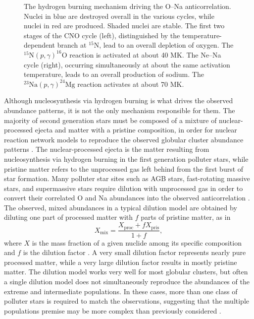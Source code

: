 \begin{figure}[t]
\begin{minipage}{.44\linewidth}
\begin{tikzpicture}[scale=1.5, every node/.style={transform shape}]
\end{tikzpicture}
\end{minipage}
\vspace{0.75 cm}
\caption{\label{fig:CNO_NeNa}The hydrogen burning mechanism driving the O--Na anticorrelation. Nuclei in blue are destroyed overall in the various cycles, while nuclei in red are produced. Shaded nuclei are stable. The first two stages of the CNO cycle (left), distinguished by the temperature-dependent branch at $^{15}$N, lead to an overall depletion of oxygen. The $^{15}\mathrm{N}(p, \gamma)^{16}\mathrm{O}$ reaction is activated at about 40 MK. The Ne--Na cycle (right), occurring simultaneously at about the same activation temperature, leads to an overall production of sodium. The $^{23}\mathrm{Na}(p,\gamma)^{24}\mathrm{Mg}$ reaction activates at about 70 MK.}
\end{figure}


Although nucleosynthesis via hydrogen burning is what drives the observed abundance patterns, it is not the only mechanism responsible for them. The majority of second generation stars must be composed of a mixture of nuclear-processed ejecta and matter with a pristine composition, in order for nuclear reaction network models to reproduce the observed globular cluster abundance patterns \cite{Prantzos2007}. The nuclear-processed ejecta is the matter resulting from nucleosynthesis via hydrogen burning in the first generation polluter stars, while pristine matter refers to the unprocessed gas left behind from the first burst of star formation. Many polluter star sites such as AGB stars, fast-rotating massive stars, and supermassive stars require dilution with unprocessed gas in order to convert their correlated O and Na abundances into the observed anticorrelation \cite{DErcole2010,DErcole2011,DErcole2012}. The observed, mixed abundances in a typical dilution model are obtained by diluting one part of processed matter with $f$ parts of pristine matter, as in
\begin{equation} \label{eqn:mixing}
X_{\mathrm{mix}} = \frac{X_{\mathrm{proc}} + f X_{\mathrm{pris}}}{1 + f},
\end{equation}
where $X$ is the mass fraction of a given nuclide among its specific composition and $f$ is the dilution factor \cite{Prantzos2007,Carretta2009}. A very small dilution factor represents nearly pure processed matter, while a very large dilution factor results in mostly pristine matter. The dilution model works very well for most globular clusters, but often a single dilution model does not simultaneously reproduce the abundances of the extreme and intermediate populations. In these cases, more than one class of polluter stars is required to match the observations, suggesting that the multiple populations premise may be more complex than previously considered \cite{Gratton2019}.

